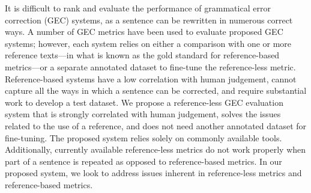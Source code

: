 It is difficult to rank and evaluate the performance of grammatical error correction (GEC) systems, as a sentence can be rewritten in numerous correct ways. A number of GEC metrics have been used to evaluate proposed GEC systems; however, each system relies on either a comparison with one or more reference texts—in what is known as the gold standard for reference-based metrics—or a separate annotated dataset to fine-tune the reference-less metric. Reference-based systems have a low correlation with human judgement, cannot capture all the ways in which a sentence can be corrected, and require substantial work to develop a test dataset. We propose a reference-less GEC evaluation system that is strongly correlated with human judgement, solves the issues related to the use of a reference, and does not need another annotated dataset for fine-tuning. The proposed system relies solely on commonly available tools. Additionally, currently available reference-less metrics do not work properly when part of a sentence is repeated as opposed to reference-based metrics. In our proposed system, we look to address issues inherent in reference-less metrics and reference-based metrics.
